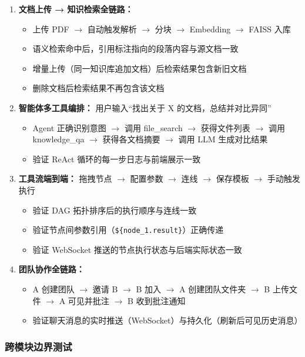 \documentclass[a4paper,zihao=-4]{ctexart}
\begin{document}
\begin{enumerate}
  \item \textbf{文档上传 → 知识检索全链路：}
        \begin{itemize}
          \item 上传 PDF $\to$ 自动触发解析 $\to$ 分块 $\to$ Embedding $\to$
                FAISS 入库
          \item 语义检索命中后，引用标注指向的段落内容与源文档一致
          \item 增量上传（同一知识库追加文档）后检索结果包含新旧文档
          \item 删除文档后检索结果不再包含该文档
        \end{itemize}
  \item \textbf{智能体多工具编排：} 用户输入“找出关于 X 的文档，总结并对比异同”
        \begin{itemize}
          \item Agent 正确识别意图 $\to$ 调用 file\_search $\to$ 获得文件列表 $\to$
                调用
                knowledge\_qa $\to$ 获得各文档摘要 $\to$ 调用 LLM 生成对比结果
          \item 验证 ReAct 循环的每一步日志与前端展示一致
        \end{itemize}
  \item \textbf{工具流端到端：} 拖拽节点 $\to$ 配置参数 $\to$ 连线 $\to$ 保存模板 $\to$ 手动触发执行
        \begin{itemize}
          \item 验证 DAG 拓扑排序后的执行顺序与连线一致
          \item 验证节点间参数引用（\texttt{\$\{node\_1.result\}}）正确传递
          \item 验证 WebSocket 推送的节点执行状态与后端实际状态一致
        \end{itemize}
  \item \textbf{团队协作全链路：}
        \begin{itemize}
          \item A 创建团队 $\to$ 邀请 B $\to$ B 加入 $\to$ A 创建团队文件夹 $\to$ B
                上传文件
                $\to$ A
                可见并批注 $\to$ B 收到批注通知
          \item 验证聊天消息的实时推送（WebSocket）与持久化（刷新后可见历史消息）
        \end{itemize}
\end{enumerate}

\subsubsection{跨模块边界测试}
\end{document}
